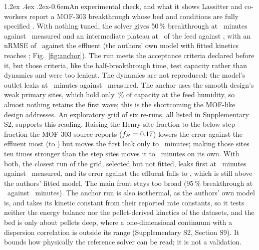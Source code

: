 \documentclass[10pt,a4paper]{article}
\makeatletter
\renewcommand\paragraph{\@startsection{paragraph}{4}{\z@}%
  {1.2ex \@plus .4ex \@minus .2ex}{-0.6em}{\normalfont\normalsize\bfseries}}
\makeatother
\begin{document}
\paragraph{An experimental check, and what it shows} Lassitter and co-workers report a
MOF-303 breakthrough whose bed and conditions are fully specified
\cite{lassitter2024mass}. With nothing tuned, the solver gives 50\,\% breakthrough at
\nAnchorTfiftyModel\ minutes against \nAnchorTfiftyExp\ measured and an intermediate
plateau at \nAnchorPlateauModel\ of the feed against \nAnchorPlateauExp, with an nRMSE of
\nAnchorNrmse\ against the effluent (the authors' own model with fitted kinetics reaches
\nAnchorNrmseComsol; Fig.~\ref{fig:anchor}). The run meets the acceptance criteria declared
before it, but those criteria, like the half-breakthrough time, test capacity rather than
dynamics and were too lenient. The dynamics are not
reproduced: the model's outlet leaks at \nAnchorTfiveModel\ minutes against
\nAnchorTfiveExp\ measured. The anchor uses the smooth design's weak primary sites, which
hold only \nIbsMofFeed\,\% of capacity at the feed humidity, so almost nothing retains the
first wave; this is the shortcoming the MOF-like design addresses. An exploratory grid of
six re-runs, all listed in Supplementary S2, supports this reading. Raising the Henry-site
fraction to the below-step fraction the MOF-303 source reports (\(f_H = 0.17\))
lowers the error against the effluent most (to \nAncWeakHighNr) but moves the first leak
only to \nAncWeakHighTfive\ minutes; making those sites ten times stronger than the step sites
moves it to \nAncStrongLowTfive\ minutes on its own. With both, the closest run of the grid,
selected but not fitted, leaks first at \nAnchorStrongTfive\
minutes against \nAnchorTfiveExp\ measured, and its error against the effluent falls to
\nAnchorStrongNrmse, which is still above the authors' fitted model. The main front stays
too broad (95\,\% breakthrough at \nAncStrongHighTnine\ against \nAnchorExpTninefive\
minutes). The anchor run is also isothermal, as the authors' own model is, and takes its
kinetic constant from their reported rate constants, so it tests neither the energy
balance nor the pellet-derived kinetics of the
datasets, and the bed is only about \nAnchorPelletsDeep{} pellets deep, where a
one-dimensional continuum with a dispersion correlation is outside its range
(Supplementary S2, Section S9). It bounds how physically the reference solver can be read;
it is not a validation.

\end{document}
